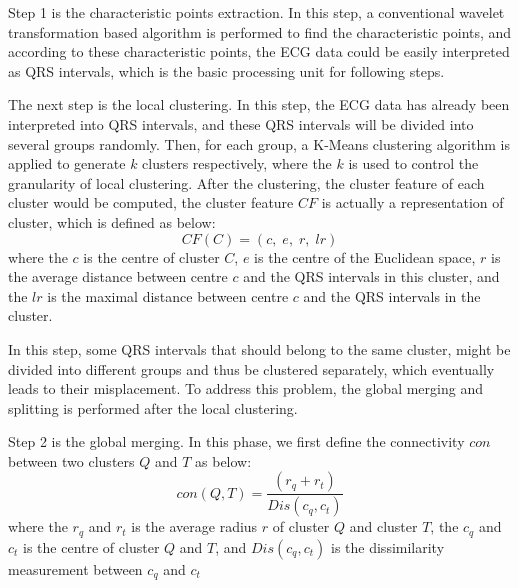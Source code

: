 \documentclass[conference]{IEEEtran}
\begin{document}
Step 1 is the characteristic points extraction. In this step, a conventional wavelet transformation based algorithm \cite{li1995detection} is performed to find the characteristic points, and according to these characteristic points, the ECG data could be easily interpreted as QRS intervals, which is the basic processing unit for following steps.


The next step is the local clustering. In this step, the ECG data has already been interpreted into QRS intervals, and these QRS intervals will be divided into several groups randomly. Then, for each group, a K-Means clustering algorithm is applied to generate $ k $ clusters respectively, where the $ k $ is used to control the granularity of local clustering. After the clustering, the cluster feature of each cluster would be computed, the cluster feature $ CF $ is actually a representation of cluster, which is defined as below:
\begin{equation}
CF(C) = (c, \; e, \; r, \; lr)
\end{equation} 
where the $ c $ is the centre of cluster $ C $, $ e $ is the centre of the Euclidean space, $ r $ is the average distance between centre $ c $ and the QRS intervals in this cluster, and the $ lr $ is the maximal distance between centre $ c $ and the QRS intervals in the cluster. 


In this step, some QRS intervals that should belong to the same cluster,  might be divided into different groups and thus be clustered separately, which eventually leads to their misplacement. To address this problem, the global merging and splitting is performed after the local clustering. 


Step 2 is the global merging. In this phase, we first define the connectivity $ con $ between two clusters $ Q $ and $ T $ as below:
\begin{equation}\label{eq_connectivity}
con(Q, T) = \frac{(r_q + r_t)}{Dis(c_q, c_t)} 
\end{equation}
where the $ r_q $ and $ r_t $ is the average radius $ r $ of cluster $ Q $ and cluster $ T $, the $ c_q $ and $ c_t $ is the centre of cluster $ Q $ and $ T $, and $ Dis(c_q, c_t) $ is the dissimilarity measurement between $ c_q $ and $ c_t $
\end{document}
